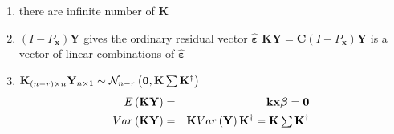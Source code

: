 \documentclass{article}
\begin{document}
\begin{enumerate}
\item there are infinite number of $\mathbf{K}$

\item $\left( I-P_{\mathbf{x}}\right) \mathbf{Y}$ gives the ordinary
residual vector $\mathbf{\hat{\varepsilon}}$\newline
$\mathbf{KY}=\mathbf{C}\left( I-P_{\mathbf{x}}\right) \mathbf{Y}$ is a
vector of linear combinations of $\mathbf{\hat{\varepsilon}}$

\item $\mathbf{K}_{\left( n-r\right) \times n}\mathbf{Y}_{n\times 1}\sim 
\mathcal{N}_{n-r}\left( \mathbf{0},\mathbf{K}\mathop{\textstyle \sum } \mathbf{K}^{\dagger
}\right) $%
\begin{eqnarray*}
E\left( \mathbf{KY}\right) &=&\mathbf{kx\beta }=\mathbf{0} \\
Var\left( \mathbf{KY}\right) &=&\mathbf{K}Var\left( \mathbf{Y}\right) 
\mathbf{K}^{\dagger }=\mathbf{K}\tsum \mathbf{K}^{\dagger }
\end{eqnarray*}
\end{enumerate}

\bigskip
\end{document}
